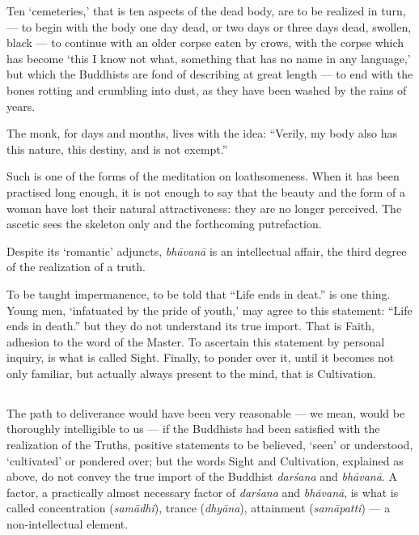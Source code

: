 \documentclass[a4paper, 11pt, oneside, english]{article}
\begin{document}
Ten `cemeteries,' that is ten aspects of the dead body, are to be realized in turn, --- to begin with the body one day dead, or two days or three days dead, swollen, black --- to continue with an older corpse eaten by crows, with the corpse which has become `this I know not what, something that has no name in any language,' but which the Buddhists are fond of describing at great length --- to end with the bones rotting and crumbling into dust, as they have been washed by the rains of years.

The monk, for days and months, lives with the idea: ``Verily, my body also has this nature, this destiny, and is not exempt.''

Such is one of the forms of the meditation on loathsomeness. When it has been practised long enough, it is not enough to say that the beauty and the form of a woman have lost their natural attractiveness: they are no longer perceived. The ascetic sees the skeleton only and the forthcoming putrefaction.

Despite its `romantic' adjuncts, \emph{bhāvanā} is an intellectual affair, the third degree of the realization of a truth.

To be taught impermanence, to be told that ``Life ends in deat.'' is one thing. Young men, `infatuated by the pride of youth,' may agree to this statement: ``Life ends in death.'' but they do not understand its true import. That is Faith, adhesion to the word of the Master. To ascertain this statement by personal inquiry, is what is called Sight. Finally, to ponder over it, until it becomes not only familiar, but actually always present to the mind, that is Cultivation.

\subsection{}
\paragraph{}
The path to deliverance would have been very reasonable --- we mean, would be thoroughly intelligible to us --- if the Buddhists had been satisfied with the realization of the Truths, positive statements to be believed, `seen' or understood, `cultivated' or pondered over; but the words Sight and Cultivation, explained as above, do not convey the true import of the Buddhist \emph{darśana} and \emph{bhāvanā}. A factor, a practically almost necessary factor of \emph{darśana} and \emph{bhāvanā}, is what is called concentration (\emph{samādhi}), trance (\emph{dhyāna}), attainment (\emph{samāpatti}) --- a non-intellectual element.
\end{document}
